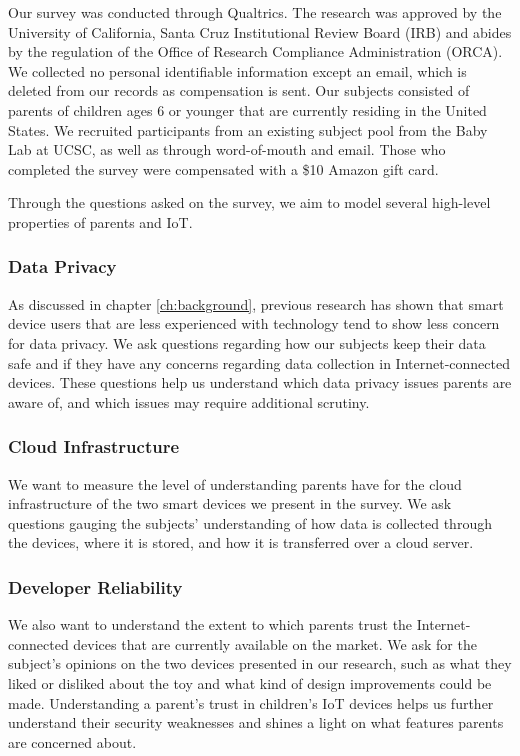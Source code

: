 \documentclass[12pt]{ucthesis}
\begin{document}
Our survey was conducted through Qualtrics. The research was approved by the University of California, Santa Cruz Institutional Review Board (IRB) and abides by the regulation of the Office of Research Compliance Administration (ORCA). We collected no personal identifiable information except an email, which is deleted from our records as compensation is sent. Our subjects consisted of parents of children ages 6 or younger that are currently residing in the United States. We recruited participants from an existing subject pool from the Baby Lab at UCSC, as well as through word-of-mouth and email. Those who completed the survey were compensated with a \$10 Amazon gift card.

Through the questions asked on the survey, we aim to model several high-level properties of parents and IoT.

\subsubsection{Data Privacy}
As discussed in chapter \ref{ch:background}, previous research has shown that smart device users that are less experienced with technology tend to show less concern for data privacy. We ask questions regarding how our subjects keep their data safe and if they have any concerns regarding data collection in Internet-connected devices. These questions help us understand which data privacy issues parents are aware of, and which issues may require additional scrutiny.

\subsubsection{Cloud Infrastructure}
We want to measure the level of understanding parents have for the cloud infrastructure of the two smart devices we present in the survey. We ask questions gauging the subjects' understanding of how data is collected through the devices, where it is stored, and how it is transferred over a cloud server. 

\subsubsection{Developer Reliability}
We also want to understand the extent to which parents trust the Internet-connected devices that are currently available on the market. We ask for the subject's opinions on the two devices presented in our research, such as what they liked or disliked about the toy and what kind of design improvements could be made. Understanding a parent's trust in children's IoT devices helps us further understand their security weaknesses and shines a light on what features parents are concerned about.
\end{document}

